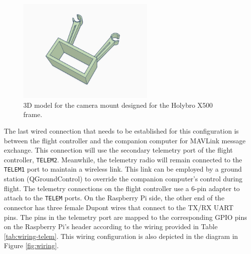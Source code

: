 \begin{figure}
  \centering
  \includegraphics[width=0.6\textwidth, keepaspectratio]{img/cam-holder.jpg}
  \caption{3D model for the camera mount designed for the Holybro X500 frame.}
  \label{fig:camera-holder-3d}
\end{figure}

The last wired connection that needs to be established for this configuration is between the flight controller and the companion computer for MAVLink message exchange.
This connection will use the secondary telemetry port of the flight controller, \texttt{TELEM2}.
Meanwhile, the telemetry radio will remain connected to the \texttt{TELEM1} port to maintain a wireless link.
This link can be employed by a ground station (QGroundControl) to override the companion computer's control during flight.
The telemetry connections on the flight controller use a 6-pin adapter to attach to the \texttt{TELEM} ports.
On the Raspberry Pi side, the other end of the connector has three female Dupont wires that connect to the TX/RX UART pins. The pins in the telemetry port are mapped to the corresponding GPIO pins on the Raspberry Pi's header according to the wiring provided in Table \ref{tab:wiring-telem}. This wiring configuration is also depicted in the diagram in Figure \ref{fig:wiring}.

